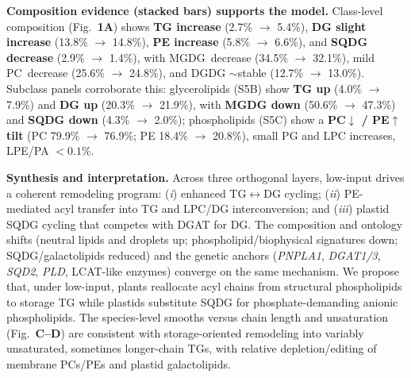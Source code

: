 \documentclass[10pt,letterpaper]{article}
\begin{document}
\noindent \textbf{Composition evidence (stacked bars) supports the model.}
Class-level composition (Fig.\ \textbf{1A}) shows \textbf{TG increase} (2.7\% $\rightarrow$ 5.4\%), \textbf{DG slight increase} (13.8\% $\rightarrow$ 14.8\%), \textbf{PE increase} (5.8\% $\rightarrow$ 6.6\%), and \textbf{SQDG decrease} (2.9\% $\rightarrow$ 1.4\%), with \mbox{MGDG decrease} (34.5\% $\rightarrow$ 32.1\%), mild \mbox{PC decrease} (25.6\% $\rightarrow$ 24.8\%), and DGDG $\sim$stable (12.7\% $\rightarrow$ 13.0\%). 
Subclass panels corroborate this: glycerolipids (S5B) show \textbf{TG up} (4.0\% $\rightarrow$ 7.9\%) and \textbf{DG up} (20.3\% $\rightarrow$ 21.9\%), with \textbf{MGDG down} (50.6\% $\rightarrow$ 47.3\%) and \textbf{SQDG down} (4.3\% $\rightarrow$ 2.0\%); phospholipids (S5C) show a \textbf{PC$\downarrow$ / PE$\uparrow$ tilt} (PC 79.9\% $\rightarrow$ 76.9\%; PE 18.4\% $\rightarrow$ 20.8\%), small PG and LPC increases, LPE/PA $<0.1\%$.

\noindent \textbf{Synthesis and interpretation.}
Across three orthogonal layers, low-input drives a coherent remodeling program: (\emph{i}) enhanced TG$\leftrightarrow$DG cycling; (\emph{ii}) PE-mediated acyl transfer into TG and LPC/DG interconversion; and (\emph{iii}) plastid SQDG cycling that competes with DGAT for DG. The composition and ontology shifts (neutral lipids and droplets up; phospholipid/biophysical signatures down; SQDG/galactolipids reduced) and the genetic anchors (\textit{PNPLA1}, \textit{DGAT1/3}, \textit{SQD2}, \textit{PLD}, LCAT-like enzymes) converge on the same mechanism. We propose that, under low-input, plants reallocate acyl chains from structural phospholipids to storage TG while plastids substitute SQDG for phosphate-demanding anionic phospholipids. The species-level smooths versus chain length and unsaturation (Fig.\ \textbf{C–D}) are consistent with storage-oriented remodeling into variably unsaturated, sometimes longer-chain TGs, with relative depletion/editing of membrane PCs/PEs and plastid galactolipids.
\end{document}
